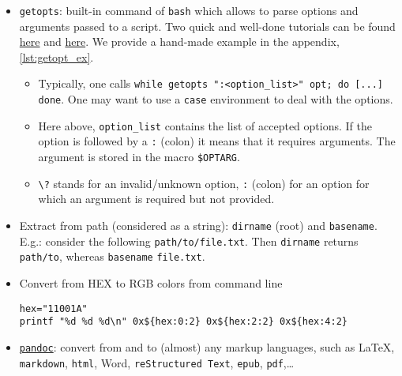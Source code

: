 \documentclass[a4paper,12pt,%
              final%
              ]{article}
\begin{document}
\begin{itemize}
    \begin{itemize}
      \item Files must be \textbf{sorted}
      \item Variable \texttt{n} is a combination of \texttt{1}, \texttt{2}, and \texttt{3}. \texttt{1} / \texttt{2} means suppress lines unique to \verb|file_1/2|, \texttt{3} means suppress shared lines
      \item Keep lines from \verb|file_1| only \verb|comm -23 <(sort file_1) <(sort file_2)|
      \item Keep lines from \verb|file_2| only \verb|comm -13 <(sort file_1) <(sort file_2)|
    \end{itemize}
  \item \texttt{getopts}: built-in command of \texttt{bash} which allows to parse options and arguments passed to a script. Two quick and well-done tutorials can be found \href{https://www.computerhope.com/unix/bash/getopts.htm}{here} and \href{https://sookocheff.com/post/bash/parsing-bash-script-arguments-with-shopts/}{here}. We provide a hand-made example in the appendix, \autoref{lst:getopt_ex}.
    \begin{itemize}
      \item Typically, one calls \verb|while getopts ":<option_list>" opt; do [...] done|. One may want to use a \verb|case| environment to deal with the options.
      \item Here above, \verb|option_list| contains the list of accepted options. If the option is followed by a \verb|:| (colon) it means that it requires arguments. The argument is stored in the macro \verb|$OPTARG|.
      \item \verb|\?| stands for an invalid/unknown option, \verb|:| (colon) for an option for which an argument is required but not provided.
    \end{itemize}
  \item Extract from path (considered as a string): \texttt{dirname} (root) and \texttt{basename}. E.g.: consider the following \texttt{path/to/file.txt}. Then \texttt{dirname} returns \texttt{path/to}, whereas \texttt{basename} \texttt{file.txt}.
  \item Convert from HEX to RGB colors from command line
\begin{verbatim}
hex="11001A"
printf "%d %d %d\n" 0x${hex:0:2} 0x${hex:2:2} 0x${hex:4:2}
\end{verbatim}
  \item \href{https://pandoc.org/}{\texttt{pandoc}}: convert from and to (almost) any markup languages, such as \LaTeX{}, \texttt{markdown}, \texttt{html}, Word, \texttt{reStructured Text}, \texttt{epub}, \texttt{pdf},\ldots
\end{itemize}
\end{document}
